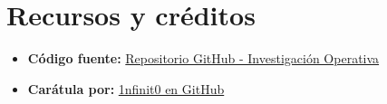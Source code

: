 \documentclass[12pt]{article}
\begin{document}
\vspace{3cm}

\section*{Recursos y créditos}

\begin{itemize}
  \item \textbf{Código fuente:} \href{https://github.com/MateoTVara/UTP}{Repositorio GitHub - Investigación Operativa}
  \item \textbf{Carátula por:} \href{https://github.com/1nfinit0}{1nfinit0 en GitHub}
\end{itemize}
\end{document}
